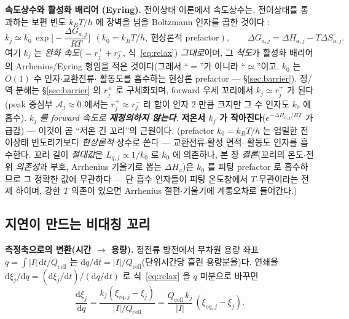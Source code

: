\documentclass[11pt,a4paper]{article}
\newcommand{\dd}{\mathrm{d}}
\newcommand{\eq}{\mathrm{eq}}
\newcommand{\cell}{\mathrm{cell}}
\begin{document}
\textbf{속도상수와 활성화 배리어 (Eyring).} 전이상태 이론에서 속도상수는, 전이상태를 통과하는 보편 빈도
$k_BT/h$ 에 장벽을 넘을 Boltzmann 인자를 곱한 것이다 \cite{eyring1935}:
\begin{equation}
k_j\simeq k_0\,\exp\!\Big[-\frac{\Delta G_{a,j}}{RT}\Big]\ \ (k_0=k_BT/h,\ \text{현상론적 prefactor}),\qquad \Delta G_{a,j}=\Delta H_{a,j}-T\Delta S_{a,j}.
\label{eq:eyring}
\end{equation}
여기 $k_j$ 는 \emph{완화 속도}($=r_j^++r_j^-$, 식~\eqref{eq:relax}) \emph{그대로}이며, 그 \emph{척도}가 활성화 배리어의
Arrhenius/Eyring 형임을 적은 것이다(그래서 ``$=$''가 아니라 ``$\simeq$''이고, $k_0$ 는 $O(1)$ 수 인자$\cdot$교환전류$\cdot$
활동도를 흡수하는 현상론 prefactor — \S\ref{sec:barrier}). 정/역 분해는 \S\ref{sec:barrier} 의 $r_j^\pm$ 로 구체화되며,
forward 우세 꼬리에서 $k_j\simeq r_j^+$ 가 된다(peak 중심부 $\mathcal A_j\approx0$ 에서는 $r_j^+\approx r_j^-$ 라 합이 인자
$2$ 만큼 크지만 그 수 인자도 $k_0$ 에 흡수). \emph{$k_j$ 를 forward 속도로 \textbf{재정의하지 않는다}.}
\textbf{저온서 $k_j$ 가 작아진다}($e^{-\Delta H_{a,j}/RT}$ 가 급감) — 이것이 곧 ``저온 긴 꼬리''의 근원이다.
(prefactor $k_0=k_BT/h$ 는 엄밀한 전이상태 빈도라기보다 \emph{현상론적} 상수로 쓴다 — 교환전류$\cdot$활성 면적$\cdot$
활동도 인자를 흡수한다. 꼬리 길이 \emph{절대값}은 $L_{q,j}\propto1/k_0$ 로 $k_0$ 에 의존하나, 본 장 \emph{결론}(꼬리의
온도$\cdot$전위 \emph{의존성}과 부호, Arrhenius 기울기로 뽑는 $\Delta H_a$)은 $k_0$ 를 피팅 prefactor 로 흡수하므로
그 정확한 값에 무관하다 — 단 흡수 인자들이 피팅 온도창에서 $T$-무관이라는 전제 하이며, 강한 $T$ 의존이 있으면
Arrhenius 절편$\cdot$기울기에 계통오차로 들어간다.)

\subsection{지연이 만드는 비대칭 꼬리}
\textbf{측정축으로의 변환(시간 $\to$ 용량).} 정전류 방전에서 무차원 용량 좌표 $q=\int|I|\,\dd t/Q_\cell$ 는
$\dd q/\dd t=|I|/Q_\cell$(단위시간당 흘린 용량분율)다. 연쇄율 $\dd\xi_j/\dd q=(\dd\xi_j/\dd t)/(\dd q/\dd t)$ 로
식~\eqref{eq:relax} 을 $q$ 미분으로 바꾸면
\begin{equation}
\frac{\dd\xi_j}{\dd q}=\frac{k_j(\xi_{\eq,j}-\xi_j)}{|I|/Q_\cell}=\frac{Q_\cell\,k_j}{|I|}\,(\xi_{\eq,j}-\xi_j).
\label{eq:dxidq}
\end{equation}
\end{document}
